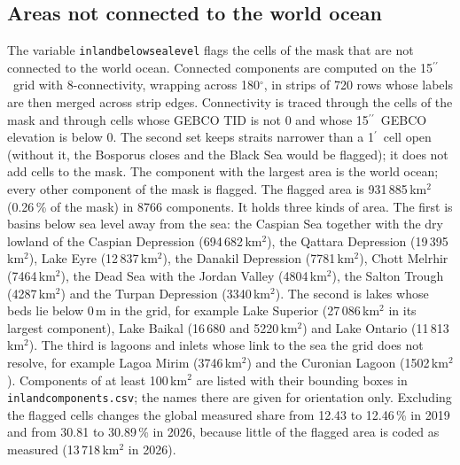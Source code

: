 \documentclass[essd, manuscript]{copernicus}
\newcommand{\as}{$^{\prime\prime}$}      %
\newcommand{\am}{$^{\prime}$}            %
\renewcommand{\_}{\usorig\allowbreak}
\begin{document}
\subsection{Areas not connected to the world ocean}
\label{sec:inland}

The variable \texttt{inland\_below\_sea\_level} flags the cells of the mask that are not connected to the world ocean.
Connected components are computed on the 15\as\ grid with 8-connectivity, wrapping across 180$^\circ$, in strips of 720 rows whose labels are then merged across strip edges.
Connectivity is traced through the cells of the mask and through cells whose GEBCO\_2026 TID is not 0 and whose 15\as\ GEBCO\_2026 elevation is below 0.
The second set keeps straits narrower than a 1\am\ cell open (without it, the Bosporus closes and the Black Sea would be flagged); it does not add cells to the mask.
The component with the largest area is the world ocean; every other component of the mask is flagged.
The flagged area is 931\,885\,km$^2$ (0.26\,\% of the mask) in 8766 components.
It holds three kinds of area.
The first is basins below sea level away from the sea: the Caspian Sea together with the dry lowland of the Caspian Depression (694\,682\,km$^2$), the Qattara Depression (19\,395\,km$^2$), Lake Eyre (12\,837\,km$^2$), the Danakil Depression (7781\,km$^2$), Chott Melrhir (7464\,km$^2$), the Dead Sea with the Jordan Valley (4804\,km$^2$), the Salton Trough (4287\,km$^2$) and the Turpan Depression (3340\,km$^2$).
The second is lakes whose beds lie below 0\,m in the grid, for example Lake Superior (27\,086\,km$^2$ in its largest component), Lake Baikal (16\,680 and 5220\,km$^2$) and Lake Ontario (11\,813\,km$^2$).
The third is lagoons and inlets whose link to the sea the grid does not resolve, for example Lagoa Mirim (3746\,km$^2$) and the Curonian Lagoon (1502\,km$^2$).
Components of at least 100\,km$^2$ are listed with their bounding boxes in \texttt{inland\_components.csv}; the names there are given for orientation only.
Excluding the flagged cells changes the global measured share from 12.43 to 12.46\,\% in 2019 and from 30.81 to 30.89\,\% in 2026, because little of the flagged area is coded as measured (13\,718\,km$^2$ in 2026).
\end{document}
